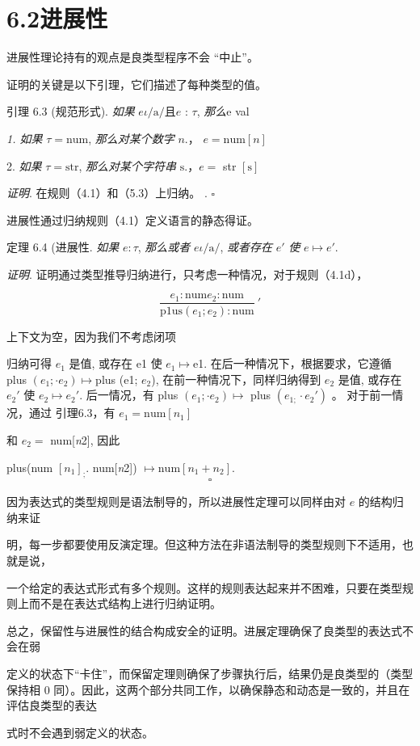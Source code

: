 \section{6.2进展性}

进展性理论持有的观点是良类型程序不会 “中止”。

证明的关键是以下引理，它们描述了每种类型的值。

引理 6.3 (规范形式). {\it 如果} $e\iota/\mathrm{a}/且 e$ : $\tau$, {\it 那么}e val%

{\it 1. 如果} $\tau=\mathrm{n}\mathrm{u}\mathrm{m}$, {\it 那么对某个数字} $n.$， $e=\mathrm{n}\mathrm{u}\mathrm{m}[n]$ 

2. {\it 如果} $\tau=\mathrm{s}\mathrm{t}\mathrm{r}$, {\it 那么对某个字符串} $\mathrm{s}.$，$e=$ str $[\mathrm{s}]$ 

{\it 证明}. 在规则（4.1）和（5.3）上归纳。 . $\square $

进展性通过归纳规则（4.1）定义语言的静态得证。

定理 6.4 (进展性. {\it 如果} $ e:\tau$, {\it 那么或者} $e\iota/\mathrm{a}/$, {\it 或者存在} $e'$ {\it 使} $e\mapsto e'.$

{\it 证明}. 证明通过类型推导归纳进行，只考虑一种情况，对于规则（4.1d），

$$
\frac{e_{1}:\mathrm{n}\mathrm{u}\mathrm{m}e_{2}:\mathrm{n}\mathrm{u}\mathrm{m}}{\mathrm{p}1\mathrm{u}\mathrm{s}(e_{1};e_{2}):\mathrm{n}\mathrm{u}\mathrm{m}}\ '
$$

上下文为空，因为我们不考虑闭项

归纳可得 $e_{1}$ 是值, 或存在 e1 使 $e_{1} \mapsto$e1. 在后一种情况下，根据要求，它遵循 plus $(e_{1};\cdot e_{2}) \mapsto$plus (e1; $e_{2}$), 在前一种情况下，同样归纳得到 $e_{2}$ 是值, 或存在 $e_{2}'$ 使 $e_{2} \mapsto e_{2}'$. 后一情况，有 plus $(e_{1};\cdot e_{2}) \mapsto$
plus $(e_{1;}\cdot e_{2}')$ 。 对于前一情况，通过
引理6.3，有 $e_{1}=\mathrm{n}\mathrm{u}\mathrm{m}[n_{1}]$

和 $e_{2}=$ num[{\it n}2], 因此

plus(num $[n_{1}]_{;}$. num[{\it n}2]) $\mapsto \mathrm{n}\mathrm{u}\mathrm{m}[n_{1}+n_{2}].$
$$
\square 
$$

因为表达式的类型规则是语法制导的，所以进展性定理可以同样由对 $e$ 的结构归纳来证

明，每一步都要使用反演定理。但这种方法在非语法制导的类型规则下不适用，也就是说，

一个给定的表达式形式有多个规则。这样的规则表达起来并不困难，只要在类型规则上而不是在表达式结构上进行归纳证明。

总之，保留性与进展性的结合构成安全的证明。进展定理确保了良类型的表达式不会在弱

定义的状态下“卡住”，而保留定理则确保了步骤执行后，结果仍是良类型的（类型保持相
0
同）。因此，这两个部分共同工作，以确保静态和动态是一致的，并且在评估良类型的表达

式时不会遇到弱定义的状态。
